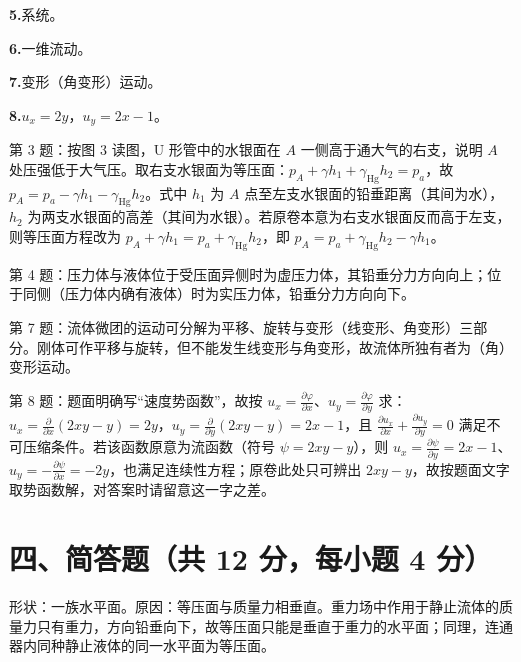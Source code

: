 \noindent\textbf{5.}\quad 系统。

\noindent\textbf{6.}\quad 一维流动。

\noindent\textbf{7.}\quad 变形（角变形）运动。

\noindent\textbf{8.}\quad $u_x=2y$，$u_y=2x-1$。

\begin{tishi}
第 3 题：按图 3 读图，U 形管中的水银面在 $A$ 一侧高于通大气的右支，说明 $A$ 处压强低于大气压。取右支水银面为等压面：$p_A+\gamma h_1+\gamma_{\mathrm{Hg}}h_2=p_a$，故 $p_A=p_a-\gamma h_1-\gamma_{\mathrm{Hg}}h_2$。式中 $h_1$ 为 $A$ 点至左支水银面的铅垂距离（其间为水），$h_2$ 为两支水银面的高差（其间为水银）。若原卷本意为右支水银面反而高于左支，则等压面方程改为 $p_A+\gamma h_1=p_a+\gamma_{\mathrm{Hg}}h_2$，即 $p_A=p_a+\gamma_{\mathrm{Hg}}h_2-\gamma h_1$。

第 4 题：压力体与液体位于受压面异侧时为虚压力体，其铅垂分力方向向上；位于同侧（压力体内确有液体）时为实压力体，铅垂分力方向向下。

第 7 题：流体微团的运动可分解为平移、旋转与变形（线变形、角变形）三部分。刚体可作平移与旋转，但不能发生线变形与角变形，故流体所独有者为（角）变形运动。

第 8 题：题面明确写“速度势函数”，故按 $u_x=\frac{\partial\varphi}{\partial x}$、$u_y=\frac{\partial\varphi}{\partial y}$ 求：$u_x=\frac{\partial}{\partial x}(2xy-y)=2y$，$u_y=\frac{\partial}{\partial y}(2xy-y)=2x-1$，且 $\frac{\partial u_x}{\partial x}+\frac{\partial u_y}{\partial y}=0$ 满足不可压缩条件。若该函数原意为流函数（符号 $\psi=2xy-y$），则 $u_x=\frac{\partial\psi}{\partial y}=2x-1$、$u_y=-\frac{\partial\psi}{\partial x}=-2y$，也满足连续性方程；原卷此处只可辨出 $2xy-y$，故按题面文字取势函数解，对答案时请留意这一字之差。
\end{tishi}

\section{四、简答题（共 12 分，每小题 4 分）}


\begin{jie}
形状：一族水平面。原因：等压面与质量力相垂直。重力场中作用于静止流体的质量力只有重力，方向铅垂向下，故等压面只能是垂直于重力的水平面；同理，连通器内同种静止液体的同一水平面为等压面。
\end{jie}


